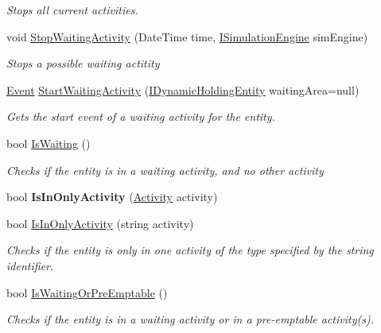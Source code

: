 \begin{DoxyCompactItemize}
\begin{DoxyCompactList}\small\item\em Stops all current activities. \end{DoxyCompactList}\item 
void \hyperlink{class_simulation_core_1_1_h_c_c_m_elements_1_1_active_entity_with_skill_a7504addb3ee98a7b579f5dd18498f1a0}{Stop\+Waiting\+Activity} (Date\+Time time, \hyperlink{interface_simulation_core_1_1_simulation_classes_1_1_i_simulation_engine}{I\+Simulation\+Engine} sim\+Engine)
\begin{DoxyCompactList}\small\item\em Stops a possible waiting actitity \end{DoxyCompactList}\item 
\hyperlink{class_simulation_core_1_1_h_c_c_m_elements_1_1_event}{Event} \hyperlink{class_simulation_core_1_1_h_c_c_m_elements_1_1_active_entity_with_skill_ad526b405516ead5a76c12b295d9017fc}{Start\+Waiting\+Activity} (\hyperlink{interface_simulation_core_1_1_h_c_c_m_elements_1_1_i_dynamic_holding_entity}{I\+Dynamic\+Holding\+Entity} waiting\+Area=null)
\begin{DoxyCompactList}\small\item\em Gets the start event of a waiting activity for the entity. \end{DoxyCompactList}\item 
bool \hyperlink{class_simulation_core_1_1_h_c_c_m_elements_1_1_active_entity_with_skill_a61166379390609fd5f40f8e2fb7d4a23}{Is\+Waiting} ()
\begin{DoxyCompactList}\small\item\em Checks if the entity is in a waiting activity, and no other activity \end{DoxyCompactList}\item 
bool {\bfseries Is\+In\+Only\+Activity} (\hyperlink{class_simulation_core_1_1_h_c_c_m_elements_1_1_activity}{Activity} activity)\hypertarget{class_simulation_core_1_1_h_c_c_m_elements_1_1_active_entity_with_skill_ac02381ee5dbac5c7a89227b84e685318}{}\label{class_simulation_core_1_1_h_c_c_m_elements_1_1_active_entity_with_skill_ac02381ee5dbac5c7a89227b84e685318}

\item 
bool \hyperlink{class_simulation_core_1_1_h_c_c_m_elements_1_1_active_entity_with_skill_a49ed7fb5cdfb54452bd04837a16ac937}{Is\+In\+Only\+Activity} (string activity)
\begin{DoxyCompactList}\small\item\em Checks if the entity is only in one activity of the type specified by the string identifier. \end{DoxyCompactList}\item 
bool \hyperlink{class_simulation_core_1_1_h_c_c_m_elements_1_1_active_entity_with_skill_a62a111c2d3f74cab8e9bdebf7c2b678d}{Is\+Waiting\+Or\+Pre\+Emptable} ()
\begin{DoxyCompactList}\small\item\em Checks if the entity is in a waiting activity or in a pre-\/emptable activity(s). \end{DoxyCompactList}\end{DoxyCompactItemize}
